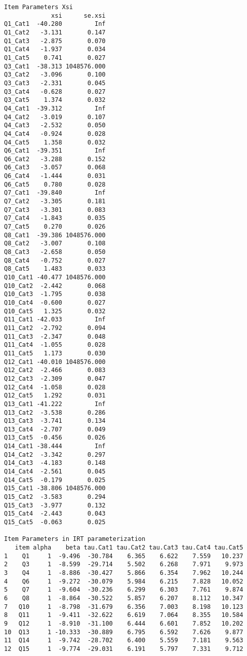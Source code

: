 \documentclass[
  letterpaper,
  DIV=11,
  numbers=noendperiod]{scrartcl}
\begin{document}
\begin{verbatim}
Item Parameters Xsi
             xsi      se.xsi
Q1_Cat1  -40.280         Inf
Q1_Cat2   -3.131       0.147
Q1_Cat3   -2.875       0.070
Q1_Cat4   -1.937       0.034
Q1_Cat5    0.741       0.027
Q3_Cat1  -38.313 1048576.000
Q3_Cat2   -3.096       0.100
Q3_Cat3   -2.331       0.045
Q3_Cat4   -0.628       0.027
Q3_Cat5    1.374       0.032
Q4_Cat1  -39.312         Inf
Q4_Cat2   -3.019       0.107
Q4_Cat3   -2.532       0.050
Q4_Cat4   -0.924       0.028
Q4_Cat5    1.358       0.032
Q6_Cat1  -39.351         Inf
Q6_Cat2   -3.288       0.152
Q6_Cat3   -3.057       0.068
Q6_Cat4   -1.444       0.031
Q6_Cat5    0.780       0.028
Q7_Cat1  -39.840         Inf
Q7_Cat2   -3.305       0.181
Q7_Cat3   -3.301       0.083
Q7_Cat4   -1.843       0.035
Q7_Cat5    0.270       0.026
Q8_Cat1  -39.386 1048576.000
Q8_Cat2   -3.007       0.108
Q8_Cat3   -2.658       0.050
Q8_Cat4   -0.752       0.027
Q8_Cat5    1.483       0.033
Q10_Cat1 -40.477 1048576.000
Q10_Cat2  -2.442       0.068
Q10_Cat3  -1.795       0.038
Q10_Cat4  -0.600       0.027
Q10_Cat5   1.325       0.032
Q11_Cat1 -42.033         Inf
Q11_Cat2  -2.792       0.094
Q11_Cat3  -2.347       0.048
Q11_Cat4  -1.055       0.028
Q11_Cat5   1.173       0.030
Q12_Cat1 -40.010 1048576.000
Q12_Cat2  -2.466       0.083
Q12_Cat3  -2.309       0.047
Q12_Cat4  -1.058       0.028
Q12_Cat5   1.292       0.031
Q13_Cat1 -41.222         Inf
Q13_Cat2  -3.538       0.286
Q13_Cat3  -3.741       0.134
Q13_Cat4  -2.707       0.049
Q13_Cat5  -0.456       0.026
Q14_Cat1 -38.444         Inf
Q14_Cat2  -3.342       0.297
Q14_Cat3  -4.183       0.148
Q14_Cat4  -2.561       0.045
Q14_Cat5  -0.179       0.025
Q15_Cat1 -38.806 1048576.000
Q15_Cat2  -3.583       0.294
Q15_Cat3  -3.977       0.132
Q15_Cat4  -2.443       0.043
Q15_Cat5  -0.063       0.025

Item Parameters in IRT parameterization
   item alpha    beta tau.Cat1 tau.Cat2 tau.Cat3 tau.Cat4 tau.Cat5
1    Q1     1  -9.496  -30.784    6.365    6.622    7.559   10.237
2    Q3     1  -8.599  -29.714    5.502    6.268    7.971    9.973
3    Q4     1  -8.886  -30.427    5.866    6.354    7.962   10.244
4    Q6     1  -9.272  -30.079    5.984    6.215    7.828   10.052
5    Q7     1  -9.604  -30.236    6.299    6.303    7.761    9.874
6    Q8     1  -8.864  -30.522    5.857    6.207    8.112   10.347
7   Q10     1  -8.798  -31.679    6.356    7.003    8.198   10.123
8   Q11     1  -9.411  -32.622    6.619    7.064    8.355   10.584
9   Q12     1  -8.910  -31.100    6.444    6.601    7.852   10.202
10  Q13     1 -10.333  -30.889    6.795    6.592    7.626    9.877
11  Q14     1  -9.742  -28.702    6.400    5.559    7.181    9.563
12  Q15     1  -9.774  -29.031    6.191    5.797    7.331    9.712
\end{verbatim}
\end{document}
